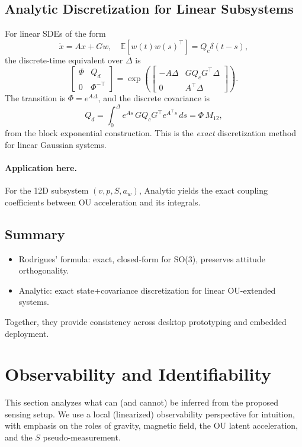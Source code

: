 \documentclass[10pt]{extarticle}
\begin{document}
\subsection{Analytic Discretization for Linear Subsystems}
For linear SDEs of the form
\[
\dot x = A x + G w,\quad \mathbb{E}[w(t)w(s)^\top] = Q_c\delta(t-s),
\]
the discrete-time equivalent over $\Delta$ is
\begin{equation}
\begin{bmatrix}
\Phi & Q_d\\ 0 & \Phi^{-\top}
\end{bmatrix}
=
\exp\!\left(
\begin{bmatrix}
-A\Delta & GQ_cG^\top\Delta\\
0 & A^\top\Delta
\end{bmatrix}
\right).
\label{eq:van-loan-final}
\end{equation}
The transition is $\Phi = e^{A\Delta}$, and the discrete covariance is
\[
Q_d = \int_0^\Delta e^{As}\,GQ_cG^\top e^{A^\top s}\,ds
= \Phi\,M_{12},
\]
from the block exponential construction. This is the \emph{exact} discretization method
for linear Gaussian systems.

\paragraph{Application here.}
For the 12D subsystem $(v,p,S,a_w)$, Analytic yields the exact coupling
coefficients between OU acceleration and its integrals. 

\subsection{Summary}
\begin{itemize}
\item Rodrigues’ formula: exact, closed-form for SO(3), preserves attitude orthogonality.
\item Analytic: exact state+covariance discretization for linear OU-extended systems.
\end{itemize}
Together, they provide consistency across desktop prototyping and embedded deployment.

\section{Observability and Identifiability}
\label{sec:observability}

This section analyzes what can (and cannot) be inferred from the proposed sensing setup.
We use a local (linearized) observability perspective for intuition, with emphasis on
the roles of gravity, magnetic field, the OU latent acceleration, and the $S$ pseudo-measurement.
\end{document}
